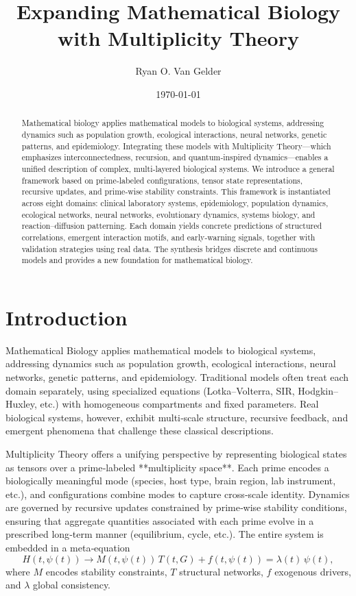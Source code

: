 \documentclass[11pt]{article}
\title{Expanding Mathematical Biology with Multiplicity Theory}
\author{Ryan O. Van Gelder}
\date{\today}
\begin{document}
\maketitle

\begin{abstract}
Mathematical biology applies mathematical models to biological systems, addressing dynamics such as population growth, ecological interactions, neural networks, genetic patterns, and epidemiology. Integrating these models with Multiplicity Theory—which emphasizes interconnectedness, recursion, and quantum‑inspired dynamics—enables a unified description of complex, multi‑layered biological systems. We introduce a general framework based on prime‑labeled configurations, tensor state representations, recursive updates, and prime‑wise stability constraints. This framework is instantiated across eight domains: clinical laboratory systems, epidemiology, population dynamics, ecological networks, neural networks, evolutionary dynamics, systems biology, and reaction–diffusion patterning. Each domain yields concrete predictions of structured correlations, emergent interaction motifs, and early‑warning signals, together with validation strategies using real data. The synthesis bridges discrete and continuous models and provides a new foundation for mathematical biology.
\end{abstract}

\section{Introduction}
\label{sec:intro}

Mathematical Biology applies mathematical models to biological systems, addressing dynamics such as population growth, ecological interactions, neural networks, genetic patterns, and epidemiology. Traditional models often treat each domain separately, using specialized equations (Lotka–Volterra, SIR, Hodgkin–Huxley, etc.) with homogeneous compartments and fixed parameters. Real biological systems, however, exhibit multi‑scale structure, recursive feedback, and emergent phenomena that challenge these classical descriptions.

Multiplicity Theory offers a unifying perspective by representing biological states as tensors over a prime‑labeled **multiplicity space**. Each prime encodes a biologically meaningful mode (species, host type, brain region, lab instrument, etc.), and configurations combine modes to capture cross‑scale identity. Dynamics are governed by recursive updates constrained by prime‑wise stability conditions, ensuring that aggregate quantities associated with each prime evolve in a prescribed long‑term manner (equilibrium, cycle, etc.). The entire system is embedded in a meta‑equation 
\[
H(t,\psi(t)) \to M(t,\psi(t))\,T(t,G) + f(t,\psi(t)) = \lambda(t)\,\psi(t),
\]
where \(M\) encodes stability constraints, \(T\) structural networks, \(f\) exogenous drivers, and \(\lambda\) global consistency.
\end{document}
